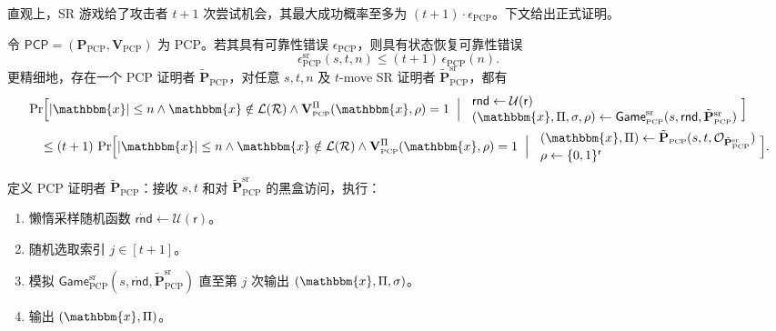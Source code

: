 \documentclass[american,singlepageview]{snargs-book-zh}
\newcommand{\Bits}{\{0,1\}}
\newcommand{\Malicious}[1]{\tilde{#1}}
\newcommand{\BlackBox}[1]{\mathcal{O}_{#1}}
\newcommand{\StateExperiment}[1]{
\!\begin{array}{l}
#1
\end{array}\!}
\newcommand{\SomeSize}[1]{|#1|}
\newcommand{\Relation}{\mathcal{R}}
\newcommand{\Language}{\mathcal{L}}
\newcommand{\GetLanguage}[1]{\Language(#1)}
\newcommand{\Instance}{\mathbbm{x}}
\newcommand{\InstanceSize}{n}
\newcommand{\ProtoProver}{P}
\newcommand{\ProtoVerifier}{V}
\newcommand{\ProtoSoundnessError}{\epsilon}
\newcommand{\ProtoRandomnessComplexity}{\mathsf{r}}
\newcommand{\SRSuperscript}{\mathrm{sr}}
\newcommand{\ProtoSRSoundnessError}{\ProtoSoundnessError^{\SRSuperscript}}
\newcommand{\PCPSymbol}{\mathsf{PCP}}
\newcommand{\PCPSubscript}{\scriptscriptstyle\mathrm{PCP}}
\newcommand{\PCPFormat}[1]{\mathbf{#1}}
\newcommand{\PCPProver}{\PCPFormat{\ProtoProver}_{\PCPSubscript}}
\newcommand{\PCPVerifier}{\PCPFormat{\ProtoVerifier}_{\PCPSubscript}}
\newcommand{\PCPMaliciousProver}{\Malicious{\PCPFormat{\ProtoProver}}_{\PCPSubscript}}
\newcommand{\PCPSystem}{(\PCPProver,\PCPVerifier)}
\newcommand{\PCPString}{\Pi}
\newcommand{\PCPVerifierRandomMessage}{\rho}
\newcommand{\PCPSoundnessError}{\ProtoSoundnessError_{\PCPSubscript}}
\newcommand{\PCPRandomnessComplexity}{\ProtoRandomnessComplexity}
\newcommand{\ROQueryBound}{t}
\newcommand{\RODistribution}[1]{\mathcal{U}(#1)}
\newcommand{\LazySRRandomness}{\mathsf{r}\dot{\mathsf{n}}\mathsf{d}}
\newcommand{\SRBudget}{t}
\newcommand{\SRSaltSize}{s}
\newcommand{\SRSaltString}{\sigma}
\newcommand{\SRIteration}{j}
\newcommand{\SRRandomness}{\mathsf{rnd}}
\newcommand{\SRGameName}[1]{\mathsf{Game}_{#1}^{\SRSuperscript}}
\newcommand{\PCPStateRestorationGame}[3]{\SRGameName{\PCPSubscript}(#1,#2,#3)}
\newcommand{\PCPSRSoundnessError}{\ProtoSRSoundnessError_{\PCPSubscript}}
\newcommand{\PCPMaliciousSRProver}{\PCPMaliciousProver^{\SRSuperscript}}
\begin{document}
直观上，SR 游戏给了攻击者 $\ROQueryBound+1$ 次尝试机会，其最大成功概率至多为 $(\ROQueryBound+1)\cdot\PCPSoundnessError$。下文给出正式证明。

\begin{theorem}
\label{theorem:pcp-srs-to-soundness}
令 $\PCPSymbol=\PCPSystem$ 为 PCP。若其具有可靠性错误 $\PCPSoundnessError$，则具有状态恢复可靠性错误
\[
\PCPSRSoundnessError(\SRSaltSize,\SRBudget,\InstanceSize)
\le (\SRBudget+1)\,\PCPSoundnessError(\InstanceSize).
\]
更精细地，存在一个 PCP 证明者 $\PCPMaliciousProver$，对任意 $\SRSaltSize,\SRBudget,\InstanceSize$ 及 $\SRBudget$-move SR 证明者 $\PCPMaliciousSRProver$，都有
\begin{align*}
&\Pr\Bigl[
\SomeSize{\Instance}\le\InstanceSize
\wedge\Instance\notin\GetLanguage{\Relation}
\wedge
\PCPVerifier^{\PCPString}(\Instance,\PCPVerifierRandomMessage)=1
\;\Bigm|\;
\StateExperiment{
  \SRRandomness\gets\RODistribution{\PCPRandomnessComplexity}\\
  (\Instance,\PCPString,\SRSaltString,\PCPVerifierRandomMessage)\gets
  \PCPStateRestorationGame{\SRSaltSize}{\SRRandomness}{\PCPMaliciousSRProver}
}
\Bigr]\\
&\quad\le
(\ROQueryBound+1)\,
\Pr\Bigl[
\SomeSize{\Instance}\le\InstanceSize
\wedge\Instance\notin\GetLanguage{\Relation}
\wedge
\PCPVerifier^{\PCPString}(\Instance,\PCPVerifierRandomMessage)=1
\;\Bigm|\;
\StateExperiment{
  (\Instance,\PCPString)\gets
    \PCPMaliciousProver(\SRSaltSize,\SRBudget,\BlackBox{\PCPMaliciousSRProver})\\
  \PCPVerifierRandomMessage\gets\Bits^{\PCPRandomnessComplexity}
}
\Bigr].
\end{align*}
\end{theorem}

\begin{construction}
\label{construction-pcp-sr-malicious-prover}
定义 PCP 证明者 $\PCPMaliciousProver$：接收 $\SRSaltSize,\SRBudget$ 和对 $\PCPMaliciousSRProver$ 的黑盒访问，执行：
\begin{enumerate}[noitemsep]
  \item 懒惰采样随机函数 $\LazySRRandomness\gets\RODistribution{\PCPRandomnessComplexity}$。
  \item 随机选取索引 $\SRIteration\in[\ROQueryBound+1]$。
  \item 模拟 $\PCPStateRestorationGame{\SRSaltSize}{\LazySRRandomness}{\PCPMaliciousSRProver}$ 直至第 $\SRIteration$ 次输出 $(\Instance,\PCPString,\SRSaltString)$。
  \item 输出 $(\Instance,\PCPString)$。
\end{enumerate}
\end{construction}
\end{document}
